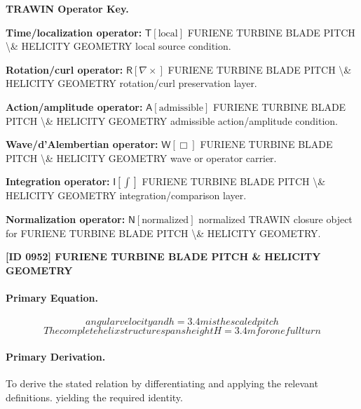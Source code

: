 \par\vspace{0.45\baselineskip}
\noindent\begin{minipage}[t]{\linewidth}
\begingroup
\small
\raggedright
\textbf{TRAWIN Operator Key.}\par
\noindent\textbf{Time/localization operator:} $\mathsf{T}\!\left[\mathrm{local}\right]$ FURIENE TURBINE BLADE PITCH \textbackslash{}\& HELICITY GEOMETRY local source condition.\par
\noindent\textbf{Rotation/curl operator:} $\mathsf{R}\!\left[\nabla\times\right]$ FURIENE TURBINE BLADE PITCH \textbackslash{}\& HELICITY GEOMETRY rotation/curl preservation layer.\par
\noindent\textbf{Action/amplitude operator:} $\mathsf{A}\!\left[\mathrm{admissible}\right]$ FURIENE TURBINE BLADE PITCH \textbackslash{}\& HELICITY GEOMETRY admissible action/amplitude condition.\par
\noindent\textbf{Wave/d'Alembertian operator:} $\mathsf{W}\!\left[\Box\right]$ FURIENE TURBINE BLADE PITCH \textbackslash{}\& HELICITY GEOMETRY wave or operator carrier.\par
\noindent\textbf{Integration operator:} $\mathsf{I}\!\left[\int\right]$ FURIENE TURBINE BLADE PITCH \textbackslash{}\& HELICITY GEOMETRY integration/comparison layer.\par
\noindent\textbf{Normalization operator:} $\mathsf{N}\!\left[\mathrm{normalized}\right]$ normalized TRAWIN closure object for FURIENE TURBINE BLADE PITCH \textbackslash{}\& HELICITY GEOMETRY.\par
\endgroup
\end{minipage}

\clearpage
\noindent\textbf{[ID 0952] FURIENE TURBINE BLADE PITCH \& HELICITY GEOMETRY}\par
\vspace{0.35em}
\paragraph{Primary Equation.}
\[
angular velocity and h = 3.4 m is the scaled pitch
\]
\[
The complete helix structure spans height H = 3.4 m for one full turn
\]

\paragraph{Primary Derivation.}
To derive the stated relation by differentiating and applying the relevant definitions. yielding the required identity.
